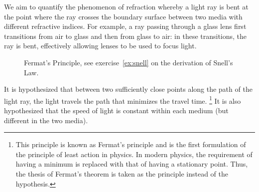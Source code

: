 \begin{exercise}
  \label{ex:snell}
We aim to quantify the phenomenon of refraction whereby a light ray is bent at
the point where the ray crosses the boundary surface between two media with
different refractive indices.
For example, a ray passing through a glass lens first transitions from air to
glass and then from glass to air: in these transitions, the ray is bent,
effectively allowing lenses to be used to focus light.

\begin{figure}
  \begin{center}
  \end{center}
\caption{Fermat's Principle, see exercise~\ref{ex:snell} on the derivation of Snell's Law.}
\end{figure}

It is hypothesized that between two sufficiently close points along the path of
the light ray, the light travels the path that minimizes the travel time.%
\footnote{
  This principle is known as Fermat's principle 
  and is the first formulation of the principle of least action in physics.
  In modern physics, the requirement of having a minimum is replaced with that 
  of having a stationary point.
  Thus, the thesis of Fermat's theorem is taken as the principle 
  instead of the hypothesis.
  }
It is also hypothesized that the speed of light is constant within each medium
(but different in the two media).


\end{exercise}
